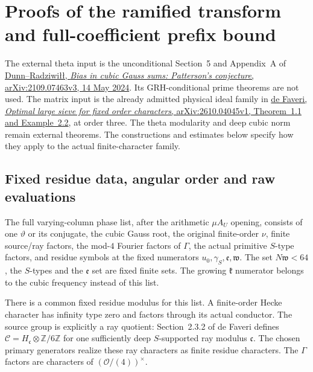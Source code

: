 \section{Proofs of the ramified transform and full-coefficient prefix bound}
\label{rg:details}
The external theta input is the unconditional Section~5 and Appendix~A
of \href{https://arxiv.org/abs/2109.07463v3}{Dunn--Radziwi\l\l,
\emph{Bias in cubic Gauss sums: Patterson's conjecture},
arXiv:2109.07463v3, 14 May 2024}.
Its GRH-conditional prime theorems are not used.
The matrix input is the already admitted physical ideal family in
\href{https://arxiv.org/abs/2610.04045v1}{de Faveri,
\emph{Optimal large sieve for fixed order characters},
arXiv:2610.04045v1, Theorem~1.1 and Example~2.2}, at order three.
The theta modularity and deep cubic norm remain external theorems.
The constructions and estimates below specify how they apply to the
actual finite-character family.

\subsection{Fixed residue data, angular order and raw evaluations}
\label{rg:finite-family-proof}
The full varying-column phase list, after the arithmetic
\(\mu A_U\) opening, consists of one \(\vartheta\) or its conjugate,
the cubic Gauss root, the original finite-order \(\nu\), finite
source/ray factors, the mod-\(4\) Fourier factors of \(\Gamma\),
the actual primitive \(S\)-type factors, and residue symbols at the
fixed numerators \(u_0,\gamma_S,\mathfrak e,\mathfrak w\).
The set \(N\mathfrak w<64\), the \(S\)-types and the \(\mathfrak e\)
set are fixed finite sets. The growing \(\mathfrak k\) numerator
belongs to the cubic frequency instead of this list.

There is a common fixed residue modulus for this list.
A finite-order Hecke character has infinity type zero and factors
through its actual conductor. The source group is explicitly a ray
quotient: Section~2.3.2 of de Faveri defines
\(\mathcal C=H_{\mathfrak c}\otimes\mathbb Z/6\mathbb Z\)
for one sufficiently deep \(S\)-supported ray modulus \(\mathfrak c\).
The chosen primary generators realize these ray characters as finite
residue characters. The \(\Gamma\) factors are characters of
\((\mathcal O/(4))^\times\).

